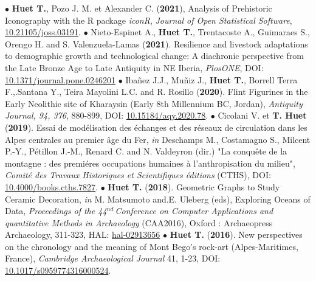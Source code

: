 \documentclass{article}
\begin{document}
\smallbreak
$\bullet$ \textbf{Huet T.}, Pozo J. M. et Alexander C. (\textbf{2021}), Analysis of Prehistoric Iconography with the R package \textit{iconR}, \textit{Journal of Open Statistical Software}, \href{https://joss.theoj.org/papers/10.21105/joss.03191}{10.21105/joss.03191}.
\smallbreak
$\bullet$ Nieto-Espinet A., \textbf{Huet T.}, Trentacoste A., Guimaraes S., Orengo H. and S. Valenzuela-Lamas (\textbf{2021}). Resilience and livestock adaptations to demographic growth and technological change: A diachronic perspective from the Late Bronze Age to Late Antiquity in NE Iberia, \textit{PlosONE}, DOI: \href{https://doi.org/10.1371/journal.pone.0246201}{10.1371/journal.pone.0246201}
\smallbreak
$\bullet$ Iba\~{n}ez J.J., Mu\~{n}iz J., \textbf{Huet T.}, Borrell Terra F.,.Santana Y., Teira Mayolini L.C. and R. Rosillo (\textbf{2020}). Flint Figurines in the Early Neolithic site of Kharaysin (Early 8th Millennium BC, Jordan), \textit{Antiquity Journal, 94, 376}, 880-899, DOI: \href{https://doi.org/10.15184/aqy.2020.78}{10.15184/aqy.2020.78}.
\smallbreak
$\bullet$ Cicolani V. et \textbf{T. Huet} (\textbf{2019}). Essai de mod\'{e}lisation des \'{e}changes et des r\'{e}seaux de circulation dans les Alpes centrales au premier \^{a}ge du Fer, \textit{in} Deschamps M., Costamagno S., Milcent P.-Y., Pétillon J.-M., Renard C. and N. Valdeyron (dir.) "La conqu\^{e}te de la montagne : des premi\'{e}res occupations humaines \`{a} l'anthropisation du milieu", \textit{Comit\'{e} des Travaux Historiques et Scientifiques \'{e}ditions} (CTHS), DOI: \href{https://books.openedition.org/cths/7827}{10.4000/books.cths.7827}.
\smallbreak
$\bullet$ \textbf{Huet T.} (\textbf{2018}). Geometric Graphs to Study Ceramic Decoration, \textit{in} M. Matsumoto and.E. Uleberg (eds), Exploring Oceans of Data, \textit{Proceedings of the 44${}^{nd\ }$Conference on Computer Applications and quantitative Methods in Archaeology} (CAA2016), Oxford : Archaeopress Archaeology, 311-323, HAL: \href{https://hal.archives-ouvertes.fr/hal-02913656}{hal-02913656}
\smallbreak
$\bullet$ \textbf{Huet T.} (\textbf{2016}). New perspectives on the chronology and the meaning of Mont Bego's rock-art (Alpes-Maritimes, France), \textit{Cambridge Archaeological Journal} 41, 1-23, DOI: \href{https://doi.org/10.1017/s0959774316000524}{10.1017/s0959774316000524}.
\smallbreak
\end{document}
